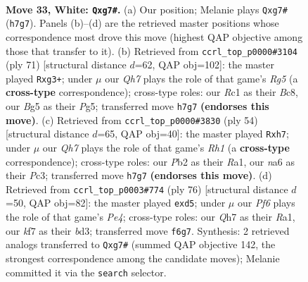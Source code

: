 \documentclass[11pt]{article}
\begin{document}
\clearpage

\begin{figure}[p]\centering
\begin{subfigure}{0.46\textwidth}\centering
\resizebox{\linewidth}{!}{%
\newchessgame
\chessboard[
  setfen={r7/pp3kpQ/n4P2/2P3B1/8/P5P1/1P3P2/2R1R1K1 w - - 0 33},
  showmover=false,
  pgfstyle=straightmove, color=movearrow, markmove={h7-g7}
]}
\caption{}
\end{subfigure}\hfill
\begin{subfigure}{0.46\textwidth}\centering
\resizebox{\linewidth}{!}{%
\newchessgame
\chessboard[
  setfen={2b2rk1/P1p5/2p5/6p1/6rp/3N2P1/3RP1K1/R7 b - - 0 36},
  showmover=false,
  pgfstyle=straightmove, color=movearrow, markmove={g4-g3}
]}
\caption{}
\end{subfigure}
\\[4pt]
\begin{subfigure}{0.46\textwidth}\centering
\resizebox{\linewidth}{!}{%
\newchessgame
\chessboard[
  setfen={4r1k1/p1p3pp/6P1/3r4/2p5/2P1P3/PP2K3/R6R w - - 0 28},
  showmover=false,
  pgfstyle=straightmove, color=movearrow, markmove={h1-h7}
]}
\caption{}
\end{subfigure}\hfill
\begin{subfigure}{0.46\textwidth}\centering
\resizebox{\linewidth}{!}{%
\newchessgame
\chessboard[
  setfen={6k1/6p1/r7/1n1p2P1/p2PP3/2Pb1P2/6P1/R3R1K1 w - - 0 39},
  showmover=false,
  pgfstyle=straightmove, color=movearrow, markmove={e4-d5}
]}
\caption{}
\end{subfigure}
\caption{\textbf{Move 33, White: \texttt{Qxg7\#}.} (a) Our position; Melanie plays \texttt{Qxg7\#} (\texttt{h7g7}). Panels (b)--(d) are the retrieved master positions whose correspondence most drove this move (highest QAP objective among those that transfer to it). (b) Retrieved from \texttt{ccrl\_top\_p0000\#3104} (ply 71) [structural distance $d$=62, QAP obj=102]: the master played \texttt{Rxg3+}; under $\mu$ our \emph{Qh7} plays the role of that game's \emph{Rg5} (a \textbf{cross-type} correspondence); cross-type roles: our \emph{R}c1 as their \emph{B}c8, our \emph{B}g5 as their \emph{P}g5; transferred move \texttt{h7g7} \textbf{(endorses this move)}. (c) Retrieved from \texttt{ccrl\_top\_p0000\#3830} (ply 54) [structural distance $d$=65, QAP obj=40]: the master played \texttt{Rxh7}; under $\mu$ our \emph{Qh7} plays the role of that game's \emph{Rh1} (a \textbf{cross-type} correspondence); cross-type roles: our \emph{P}b2 as their \emph{R}a1, our \emph{n}a6 as their \emph{P}c3; transferred move \texttt{h7g7} \textbf{(endorses this move)}. (d) Retrieved from \texttt{ccrl\_top\_p0003\#774} (ply 76) [structural distance $d$=50, QAP obj=82]: the master played \texttt{exd5}; under $\mu$ our \emph{Pf6} plays the role of that game's \emph{Pe4}; cross-type roles: our \emph{Q}h7 as their \emph{R}a1, our \emph{k}f7 as their \emph{b}d3; transferred move \texttt{f6g7}. Synthesis: 2 retrieved analogs transferred to \texttt{Qxg7\#} (summed QAP objective 142, the strongest correspondence among the candidate moves); Melanie committed it via the \texttt{search} selector.}
\label{fig:thought-m64}
\end{figure}
\end{document}
